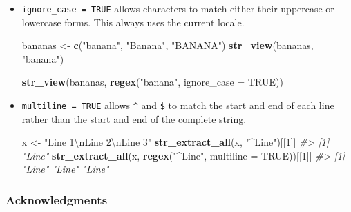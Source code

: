 \documentclass[]{book}
\newenvironment{Shaded}{\begin{snugshade}}{\end{snugshade}}
\newcommand{\KeywordTok}[1]{\textcolor[rgb]{0.13,0.29,0.53}{\textbf{#1}}}
\newcommand{\DataTypeTok}[1]{\textcolor[rgb]{0.13,0.29,0.53}{#1}}
\newcommand{\DecValTok}[1]{\textcolor[rgb]{0.00,0.00,0.81}{#1}}
\newcommand{\CharTok}[1]{\textcolor[rgb]{0.31,0.60,0.02}{#1}}
\newcommand{\StringTok}[1]{\textcolor[rgb]{0.31,0.60,0.02}{#1}}
\newcommand{\CommentTok}[1]{\textcolor[rgb]{0.56,0.35,0.01}{\textit{#1}}}
\newcommand{\OtherTok}[1]{\textcolor[rgb]{0.56,0.35,0.01}{#1}}
\newcommand{\NormalTok}[1]{#1}
\begin{document}
\begin{itemize}
\item
  \texttt{ignore\_case\ =\ TRUE} allows characters to match either their
  uppercase or lowercase forms. This always uses the current locale.

\begin{Shaded}
\begin{Highlighting}[]
\NormalTok{bananas <-}\StringTok{ }\KeywordTok{c}\NormalTok{(}\StringTok{"banana"}\NormalTok{, }\StringTok{"Banana"}\NormalTok{, }\StringTok{"BANANA"}\NormalTok{)}
\KeywordTok{str_view}\NormalTok{(bananas, }\StringTok{"banana"}\NormalTok{)}
\end{Highlighting}
\end{Shaded}

  \hypertarget{htmlwidget-1834a22cd196f3aa03a1}{}

\begin{Shaded}
\begin{Highlighting}[]
\KeywordTok{str_view}\NormalTok{(bananas, }\KeywordTok{regex}\NormalTok{(}\StringTok{"banana"}\NormalTok{, }\DataTypeTok{ignore_case =} \OtherTok{TRUE}\NormalTok{))}
\end{Highlighting}
\end{Shaded}

  \hypertarget{htmlwidget-28515d92cb327f90c9eb}{}
\item
  \texttt{multiline\ =\ TRUE} allows \texttt{\^{}} and \texttt{\$} to
  match the start and end of each line rather than the start and end of
  the complete string.

\begin{Shaded}
\begin{Highlighting}[]
\NormalTok{x <-}\StringTok{ "Line 1}\CharTok{\textbackslash{}n}\StringTok{Line 2}\CharTok{\textbackslash{}n}\StringTok{Line 3"}
\KeywordTok{str_extract_all}\NormalTok{(x, }\StringTok{"^Line"}\NormalTok{)[[}\DecValTok{1}\NormalTok{]]}
\CommentTok{#> [1] "Line"}
\KeywordTok{str_extract_all}\NormalTok{(x, }\KeywordTok{regex}\NormalTok{(}\StringTok{"^Line"}\NormalTok{, }\DataTypeTok{multiline =} \OtherTok{TRUE}\NormalTok{))[[}\DecValTok{1}\NormalTok{]]}
\CommentTok{#> [1] "Line" "Line" "Line"}
\end{Highlighting}
\end{Shaded}
\end{itemize}

\subsubsection*{Acknowledgments}\label{acknowledgments-4}
\end{document}
